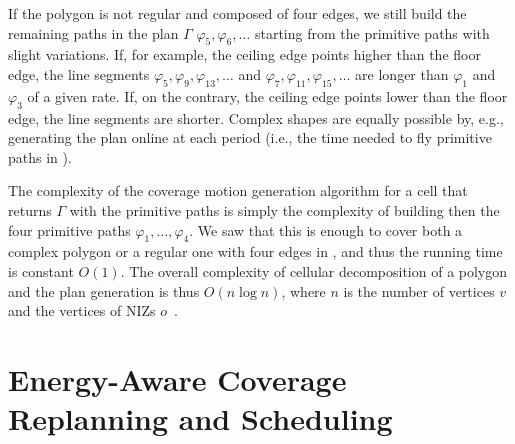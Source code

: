 If the polygon is not regular and composed of four edges, we still build the remaining paths in the plan $\Gamma$ $\varphi_5,\varphi_6,\dots$ starting from the primitive paths with slight variations. If, for example, the ceiling edge points higher than the floor edge, the line segments $\varphi_5,\varphi_9,\varphi_{13},\dots$ and $\varphi_7,\varphi_{11},\varphi_{15},\dots$ are longer than $\varphi_{1}$ and $\varphi_3$ of a given rate. If, on the contrary, the ceiling edge points lower than the floor edge, the line segments are shorter. Complex shapes are equally possible by, e.g., generating the plan online at each period (i.e., the time needed to fly primitive paths in ). 

The complexity of the coverage motion generation algorithm for a cell that returns $\Gamma$ with the primitive paths is simply the complexity of building then the four primitive paths $\varphi_1,\dots,\varphi_4$. We saw that this is enough to cover both a complex polygon or a regular one with four edges in , and thus the running time is constant $O(1)$. The overall complexity of cellular decomposition of a polygon and the plan generation is thus $O(n\log{n})$, where $n$ is the number of vertices $v$ and the vertices of NIZs $o$~\citep{choset2000exact}.




%


\section{Energy-Aware Coverage Replanning and Scheduling}
\label{sec:mpc}

